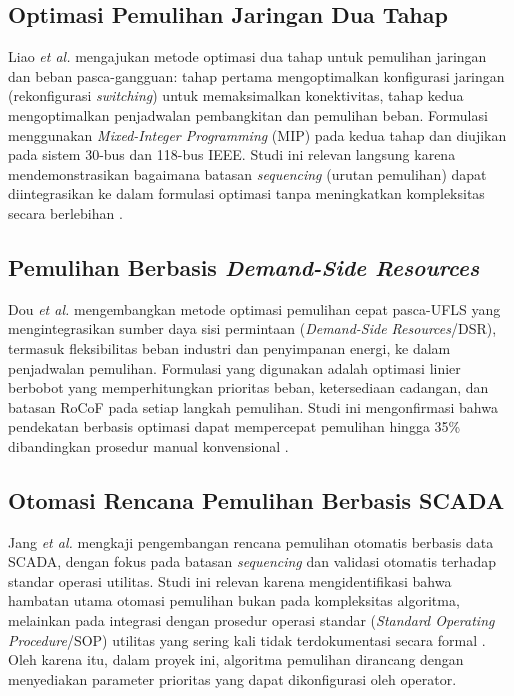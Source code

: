\subsection{Optimasi Pemulihan Jaringan Dua Tahap}
\label{subsec:Optimasi_Pemulihan_Jaringan_Dua_Tahap}

Liao \textit{et al.} \cite{Liao2019} mengajukan metode optimasi dua tahap untuk pemulihan jaringan dan beban pasca-gangguan: tahap pertama mengoptimalkan konfigurasi jaringan (rekonfigurasi \textit{switching}) untuk memaksimalkan konektivitas, tahap kedua mengoptimalkan penjadwalan pembangkitan dan pemulihan beban. Formulasi menggunakan \textit{Mixed-Integer Programming} (MIP) pada kedua tahap dan diujikan pada sistem 30-bus dan 118-bus IEEE. Studi ini relevan langsung karena mendemonstrasikan bagaimana batasan \textit{sequencing} (urutan pemulihan) dapat diintegrasikan ke dalam formulasi optimasi tanpa meningkatkan kompleksitas secara berlebihan \cite{Liao2019}.

\subsection{Pemulihan Berbasis \textit{Demand-Side Resources}}
\label{subsec:Pemulihan_Berbasis_DSR}

Dou \textit{et al.} \cite{Dou2023} mengembangkan metode optimasi pemulihan cepat pasca-UFLS yang mengintegrasikan sumber daya sisi permintaan (\textit{Demand-Side Resources}/DSR), termasuk fleksibilitas beban industri dan penyimpanan energi, ke dalam penjadwalan pemulihan. Formulasi yang digunakan adalah optimasi linier berbobot yang memperhitungkan prioritas beban, ketersediaan cadangan, dan batasan RoCoF pada setiap langkah pemulihan. Studi ini mengonfirmasi bahwa pendekatan berbasis optimasi dapat mempercepat pemulihan hingga 35\% dibandingkan prosedur manual konvensional \cite{Dou2023}.

\subsection{Otomasi Rencana Pemulihan Berbasis SCADA}
\label{subsec:Otomasi_Rencana_Pemulihan_Berbasis_SCADA}

Jang \textit{et al.} \cite{Jang2021} mengkaji pengembangan rencana pemulihan otomatis berbasis data SCADA, dengan fokus pada batasan \textit{sequencing} dan validasi otomatis terhadap standar operasi utilitas. Studi ini relevan karena mengidentifikasi bahwa hambatan utama otomasi pemulihan bukan pada kompleksitas algoritma, melainkan pada integrasi dengan prosedur operasi standar (\textit{Standard Operating Procedure}/SOP) utilitas yang sering kali tidak terdokumentasi secara formal \cite{Jang2021}. Oleh karena itu, dalam proyek ini, algoritma pemulihan dirancang dengan menyediakan parameter prioritas yang dapat dikonfigurasi oleh operator.

